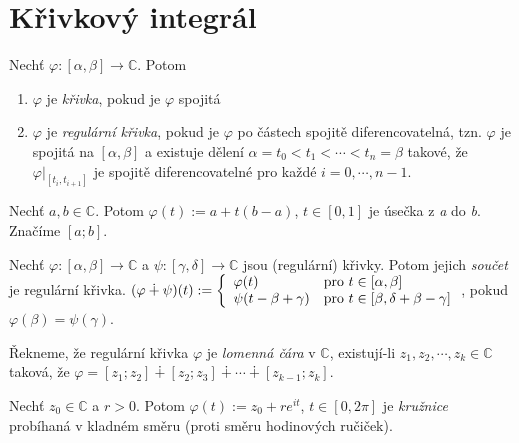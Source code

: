 \section{\texorpdfstring{Křivkový integrál}{Krivkový integrál}}
\begin{definition}
Nechť $\varphi:[\alpha,\beta] \rightarrow \mathbb{C}$. Potom
\begin{enumerate}
    \item $\varphi$ je \emph{křivka}, pokud je $\varphi$ spojitá
    \item $\varphi$ je \emph{regulární křivka}, pokud je $\varphi$ po částech spojitě diferencovatelná, tzn. $\varphi$ je spojitá na $[\alpha,\beta]$ a existuje dělení $\alpha = t_0<t_1<\cdots <t_n=\beta$ takové, že
    $\varphi \big\rvert
     _{[t_i,t_{i+1}]} 
    $ je spojitě diferencovatelné pro každé $i=0,\cdots,n-1$.
\end{enumerate}
\end{definition}

\begin{definition}[Úsečka]
Nechť $a, b \in \mathbb{C}$. Potom $\varphi(t):= a + t(b-a)$, $ t \in [0,1]$ je úsečka z \emph{a} do \emph{b}. Značíme $[a;b]$.%
\end{definition} 

\begin{notation}
Nechť $\varphi:[\alpha,\beta]\rightarrow\mathbb{C}$ a $\psi:[\gamma,\delta]\rightarrow\mathbb{C}$ jsou (regulární) křivky. Potom jejich \emph{součet} je regulární křivka.
$(\varphi \dotplus \psi)(t) := 
\left\{ \begin{array}{ll}  \varphi(t)  & \mbox{pro } t \in[\alpha,\beta] \\ \psi(t-\beta+\gamma) & \mbox{pro } t \in[\beta,\delta+\beta-\gamma] \end{array} \right.$, pokud $\varphi(\beta)=\psi(\gamma)$.
\end{notation}

\begin{definition}
Řekneme, že regulární křivka $\varphi$ je \emph{lomenná čára} v $\mathbb{C}$, existují-li $z_1,z_2,\cdots,z_k \in \mathbb{C}$ taková, že $\varphi=[z_1;z_2]\dotplus[z_2;z_3]\dotplus\cdots\dotplus[z_{k-1};z_k]$.%
\end{definition}


\begin{definition}[Kružnice]
Nechť $z_0\in\mathbb{C}$ a $r>0$. Potom $\varphi(t):=z_0+re^{it}$, $t\in [0,2\pi]$ je \emph{kružnice} probíhaná v kladném směru (proti směru hodinových ručiček).
\end{definition}


